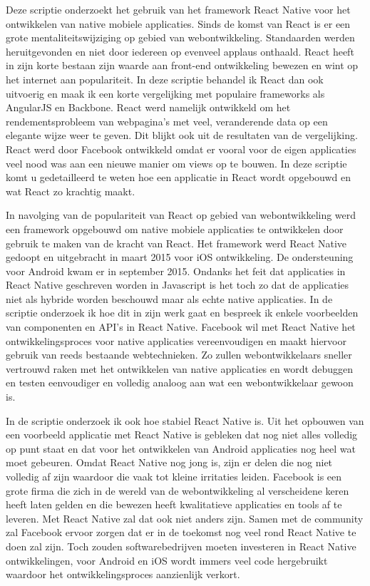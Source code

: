Deze scriptie onderzoekt het gebruik van het framework React Native voor het ontwikkelen van native mobiele applicaties. Sinds de komst van React is er een grote mentaliteitswijziging op gebied van webontwikkeling. Standaarden werden heruitgevonden en niet door iedereen op evenveel applaus onthaald. React heeft in zijn korte bestaan zijn waarde aan front-end ontwikkeling bewezen en wint op het internet aan populariteit. In deze scriptie behandel ik React dan ook uitvoerig en maak ik een korte vergelijking met populaire frameworks als AngularJS en Backbone. React werd namelijk ontwikkeld om het rendementsprobleem van webpagina's met veel, veranderende data op een elegante wijze weer te geven. Dit blijkt ook uit de resultaten van de vergelijking. React werd door Facebook ontwikkeld omdat er vooral voor de eigen applicaties veel nood was aan een nieuwe manier om views op te bouwen. In deze scriptie komt u gedetailleerd te weten hoe een applicatie in React wordt opgebouwd en wat React zo krachtig maakt. 

In navolging van de populariteit van React op gebied van webontwikkeling werd een framework opgebouwd om native mobiele applicaties te ontwikkelen door gebruik te maken van de kracht van React. Het framework werd React Native gedoopt en uitgebracht in maart 2015 voor iOS ontwikkeling. De ondersteuning voor Android kwam er in september 2015. Ondanks het feit dat applicaties in React Native geschreven worden in Javascript is het toch zo dat de applicaties niet als hybride worden beschouwd maar als echte native applicaties. In de scriptie onderzoek ik hoe dit in zijn werk gaat en bespreek ik enkele voorbeelden van componenten en API's in React Native. Facebook wil met React Native het ontwikkelingsproces voor native applicaties vereenvoudigen en maakt hiervoor gebruik van reeds bestaande webtechnieken. Zo zullen webontwikkelaars sneller vertrouwd raken met het ontwikkelen van native applicaties en wordt debuggen en testen eenvoudiger en volledig analoog aan wat een webontwikkelaar gewoon is. 

In de scriptie onderzoek ik ook hoe stabiel React Native is. Uit het opbouwen van een voorbeeld applicatie met React Native is gebleken dat nog niet alles volledig op punt staat en dat voor het ontwikkelen van Android applicaties nog heel wat moet gebeuren. Omdat React Native nog jong is, zijn er delen die nog niet volledig af zijn waardoor die vaak tot kleine irritaties leiden. Facebook is een grote firma die zich in de wereld van de webontwikkeling al verscheidene keren heeft laten gelden en die bewezen heeft kwalitatieve applicaties en tools af te leveren. 
Met React Native zal dat ook niet anders zijn. Samen met de community zal Facebook ervoor zorgen dat er in de toekomst nog veel rond React Native te doen zal zijn. 
Toch zouden softwarebedrijven moeten investeren in React Native ontwikkelingen, voor Android en iOS wordt immers veel code hergebruikt waardoor het ontwikkelingsproces aanzienlijk verkort.


 